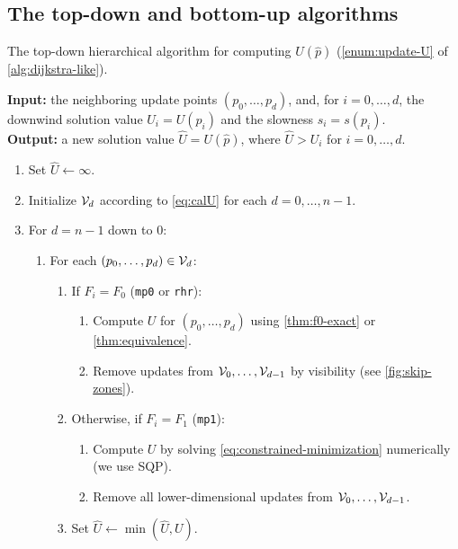 \documentclass{article}
\begin{document}
\subsection{The top-down and bottom-up algorithms}

\begin{algorithm}[t]
  \caption{The top-down hierarchical algorithm for computing
    $U(\hat{p})$ (\cref{enum:update-U} of
    \cref{alg:dijkstra-like}).}\label{alg:top-down}
  \textbf{Input:} the neighboring update points $(p_0, \hdots, p_d)$,
  and, for $i = 0, \hdots, d$, the downwind solution value
  $U_i = U(p_i)$ and the slowness $s_i = s(p_i)$. \\
  \textbf{Output:} a new solution value $\hat{U} = U(\hat{p})$, where
  $\hat{U} > U_i$ for $i = 0, \hdots, d$.
  \begin{enumerate}[nolistsep]
  \item Set $\hat{U} \gets \infty$.
  \item Initialize $\mathcal{V}_d$ according to \cref{eq:calU} for each
    $d = 0, \hdots, n - 1$.
  \item For $d = n - 1$ down to $0$:
    \begin{enumerate}
    \item For each $(p_0, \hdots, p_d) \in \mathcal{V}_d$:
      \begin{enumerate}
      \item If $F_i = F_0$ (\texttt{mp0} or \texttt{rhr}):
        \begin{enumerate}
        \item Compute $U$ for $(p_0, \hdots, p_{d})$ using
          \cref{thm:f0-exact} or \cref{thm:equivalence}.
        \item Remove updates from $\mathcal{V}_0, \hdots, \mathcal{V}_{d-1}$ by
          visibility (see \cref{fig:skip-zones}).
        \end{enumerate}
      \item Otherwise, if $F_i = F_1$ (\texttt{mp1}):
        \begin{enumerate}
        \item Compute $U$ by solving
          \cref{eq:constrained-minimization} numerically (we use SQP).
        \item Remove all lower-dimensional updates from
          $\mathcal{V}_0, \hdots, \mathcal{V}_{d-1}$.
        \end{enumerate}
      \item Set $\hat{U} \gets \min(\hat{U}, U)$.
      \end{enumerate}
    \end{enumerate}
  \end{enumerate}
\end{algorithm}
\end{document}
